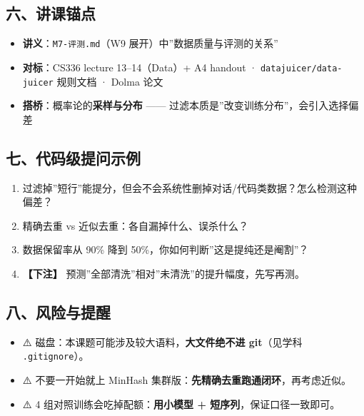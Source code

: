 \documentclass[
  chinese,
  11pt,
]{ctexart}
\providecommand{\tightlist}{%
  \setlength{\itemsep}{0pt}\setlength{\parskip}{0pt}}
\begin{document}
\subsection{六、讲课锚点}\label{ux516dux8bb2ux8bfeux951aux70b9}

\begin{itemize}
\tightlist
\item
  \textbf{讲义}：\texttt{M7-评测.md}（W9 展开）中''数据质量与评测的关系''
\item
  \textbf{对标}：CS336 lecture 13--14（Data）+ A4 handout · \texttt{datajuicer/data-juicer} 规则文档 · Dolma 论文
\item
  \textbf{搭桥}：概率论的\textbf{采样与分布} ------ 过滤本质是''改变训练分布''，会引入选择偏差
\end{itemize}

\subsection{七、代码级提问示例}\label{ux4e03ux4ee3ux7801ux7ea7ux63d0ux95eeux793aux4f8b}

\begin{enumerate}
\def\labelenumi{\arabic{enumi}.}
\tightlist
\item
  过滤掉''短行''能提分，但会不会系统性删掉对话/代码类数据？怎么检测这种偏差？
\item
  精确去重 vs 近似去重：各自漏掉什么、误杀什么？
\item
  数据保留率从 90\% 降到 50\%，你如何判断''这是提纯还是阉割''？
\item
  \textbf{【下注】} 预测''全部清洗''相对''未清洗''的提升幅度，先写再测。
\end{enumerate}

\subsection{八、风险与提醒}\label{ux516bux98ceux9669ux4e0eux63d0ux9192}

\begin{itemize}
\tightlist
\item
  ⚠️ 磁盘：本课题可能涉及较大语料，\textbf{大文件绝不进 git}（见学科 \texttt{.gitignore}）。
\item
  ⚠️ 不要一开始就上 MinHash 集群版：\textbf{先精确去重跑通闭环}，再考虑近似。
\item
  ⚠️ 4 组对照训练会吃掉配额：\textbf{用小模型 + 短序列}，保证口径一致即可。
\end{itemize}
\end{document}
